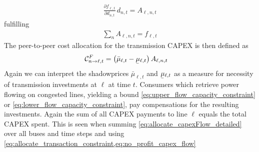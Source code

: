 \documentclass[11pt,twocolumn]{article}
\newcommand{\ubar}[1]{\underaccent{\bar}{#1}}
\newcommand{\hpad}{\hspace{15pt}}
\newcommand{\pdv}[2]{\frac{\partial #1}{\partial #2}}
\newcommand{\capacityGeneration}{G_{s}}
\newcommand{\capacityGenerationUpper}{\bar{G}_{s}}
\newcommand{\capacityGenerationLower}{\ubar{G}_{s}}
\newcommand{\capacityFlow}{F_{\ell}}
\newcommand{\capacityFlowUpper}{\bar{F}_{\ell}}
\newcommand{\capacityFlowLower}{\ubar{F}_{\ell}}
\newcommand{\demand}[1][n]{d_{#1,t}}
\newcommand{\muuppergeneration}{\bar{\mu}_{s,t}}
\newcommand{\mulowerflow}{\ubar{\mu}_{\ell,t}}
\newcommand{\muupperflow}{\bar{\mu}_{\ell,t}}
\newcommand{\flow}{f_{\ell,t}}
\newcommand{\allocateFlow}[1][n]{A_{\ell,#1,t}}
\newcommand{\allocateCapexFlow}[1][n]{\mathcal{C}^{F}_{#1,t}}
\begin{document}
\begin{align}
 \pdv{\flow}{\demand}\, \demand = \allocateFlow
\end{align}
fulfilling 
\begin{align}
\sum_{n} \allocateFlow = \flow 
\label{eq:allocate_transaction_constraint}
\end{align}
% 
The peer-to-peer cost allocation for the transmission CAPEX is then defined as 
\begin{align}
 \allocateCapexFlow[n \rightarrow \ell] &=  
\left( \muupperflow - \mulowerflow\right)  \allocateFlow
\label{eq:allocate_capexFlow_detailed}
\end{align}
% 
Again we can interpret the shadowprices $\muupperflow$ and $\mulowerflow$ as a measure for necessity of transmission investments at $\ell$ at time $t$. Consumers which retrieve power flowing on congested lines, yielding a bound \cref{eq:upper_flow_capacity_constraint} or \eqref{eq:lower_flow_capacity_constraint}, pay compensations for the resulting investments. Again the sum of all CAPEX payments to line $\ell$ equals the total CAPEX spent. This is seen when summing \cref{eq:allocate_capexFlow_detailed} over all buses and time steps and using \cref{eq:allocate_transaction_constraint,eq:no_profit_capex_flow}
 

% 
\end{document}
